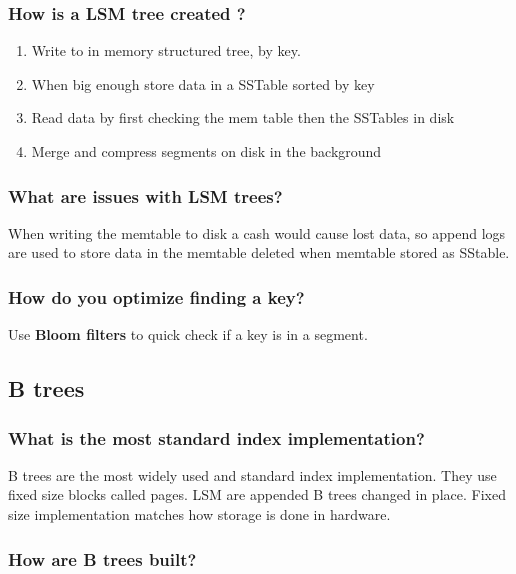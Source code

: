 \documentclass[11pt]{scrartcl} %
\begin{document}
\subsubsection{How is a LSM tree created ?}

\begin{enumerate}
	\item Write to in memory structured tree, by key.
	\item When big enough store data in a SSTable sorted by key
	\item Read data by first checking the mem table then the SSTables in disk
	\item Merge and compress segments on disk in the background
\end{enumerate}

\subsubsection{What are issues with LSM trees?}

When writing the memtable to disk a cash would cause lost data, so append logs are used to store
data in the memtable deleted when memtable stored as SStable. 

\subsubsection{How do you optimize finding a key?}

Use \textbf{Bloom filters} to quick check if a key is in a segment.

\subsection{B trees}

\subsubsection{What is the most standard index implementation?}

B trees are the most widely used and standard index implementation. They use fixed size blocks called pages. LSM are
appended B trees changed in place. Fixed size implementation matches how storage is done in hardware.

\subsubsection{How are B trees built?}
\end{document}
